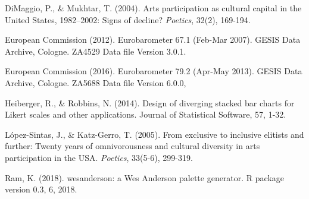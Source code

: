 \documentclass{article}
\begin{document}
DiMaggio, P., \& Mukhtar, T. (2004). Arts participation as cultural capital in the United States, 1982–2002: Signs of decline? \textit{Poetics}, 32(2), 169-194.

European Commission (2012). Eurobarometer 67.1 (Feb-Mar 2007). GESIS Data Archive, Cologne. ZA4529 Data file Version 3.0.1. 

European Commission (2016). Eurobarometer 79.2 (Apr-May 2013). GESIS Data Archive, Cologne. ZA5688 Data file Version 6.0.0, 

Heiberger, R., \& Robbins, N. (2014). Design of diverging stacked bar charts for Likert scales and other applications. Journal of Statistical Software, 57, 1-32.

López-Sintas, J., \& Katz-Gerro, T. (2005). From exclusive to inclusive elitists and further: Twenty years of omnivorousness and cultural diversity in arts participation in the USA. \textit{Poetics}, 33(5-6), 299-319.

Ram, K. (2018). wesanderson: a Wes Anderson palette generator. R package version 0.3, 6, 2018.
\end{document}
